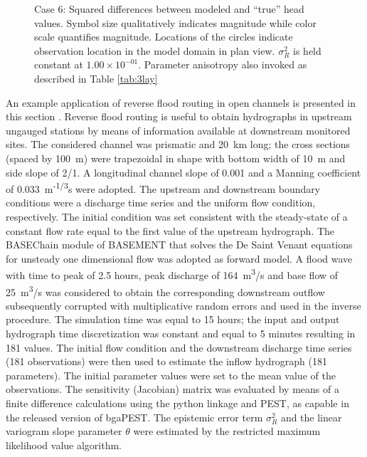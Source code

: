 \documentclass[11pt,oneside,onecolumn]{usgsreport}
\begin{document}
\begin{appendix}
\begin{figure}[!t]
\caption{\label{fig:3Lresid_case6}Case 6: Squared differences between modeled
and ``true'' head values. Symbol size qualitatively indicates magnitude
while color scale quantifies magnitude. Locations of the circles indicate
observation location in the model domain in plan view. $\sigma_{R}^{2}$ is held constant at $1.00\times10^{-01}$. Parameter anisotropy also invoked as described in Table \ref{tab:3lay}}
\end{figure}




An example application of reverse flood routing in open channels is
presented in this section \citep{doriareverserouting}. Reverse flood
routing is useful to obtain hydrographs in upstream ungauged stations
by means of information available at downstream monitored sites. The
considered channel was prismatic and 20~km long; the cross sections
(spaced by 100~m) were trapezoidal in shape with bottom width of
10~m and side slope of 2/1. A longitudinal channel slope of 0.001
and a Manning coefficient of 0.033~m\textsuperscript{-1/3}s were
adopted. The upstream and downstream boundary conditions were a discharge
time series and the uniform flow condition, respectively. The initial
condition was set consistent with the steady-state of a constant flow
rate equal to the first value of the upstream hydrograph. The BASEChain
module of BASEMENT \citep{Basement} that solves the De Saint Venant
equations for unsteady one dimensional flow was adopted as forward
model. A flood wave with time to peak of 2.5 hours, peak discharge
of 164~m\textsuperscript{3}/s and base flow of 25~m\textsuperscript{3}/s
was considered to obtain the corresponding downstream outflow subsequently
corrupted with multiplicative random errors and used in the inverse
procedure. The simulation time was equal to 15 hours; the input and
output hydrograph time discretization was constant and equal to 5
minutes resulting in 181 values. The initial flow condition and the
downstream discharge time series (181 observations) were then used
to estimate the inflow hydrograph (181 parameters). The initial parameter
values were set to the mean value of the observations. The sensitivity
(Jacobian) matrix was evaluated by means of a finite difference calculations
using the python linkage and PEST, as capable in the released version
of bgaPEST. The epistemic error term $\sigma_{R}^{2}$ and the linear
variogram slope parameter $\theta$ were estimated by the restricted
maximum likelihood value algorithm. 


\end{appendix}
\end{document}
